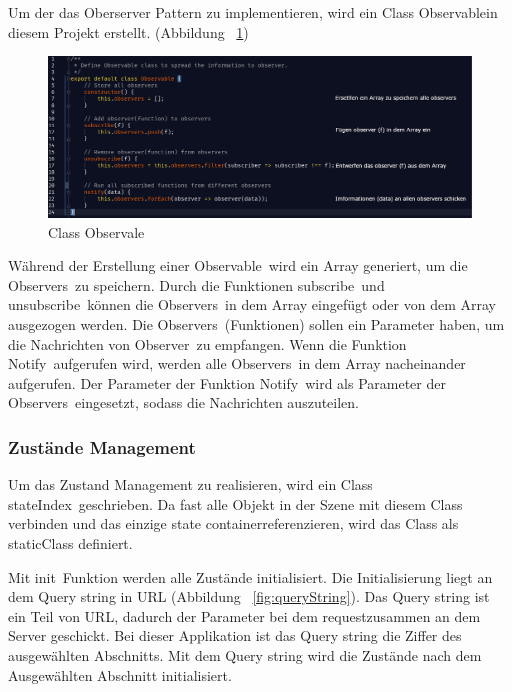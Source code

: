   Um der das Oberserver Pattern zu implementieren, wird ein Class \glqq Observable\grqq in diesem Projekt erstellt. (Abbildung ~\ref{fig:observable})
  
\begin{figure}[ht]
\vspace*{0.3cm}
\centering
\includegraphics[width=\textwidth]{images/observable.png}
\caption[Class Observable]{Class Observale}
\label{fig:observable} 
\end{figure}
  
  Während der Erstellung einer \glqq Observable\grqq\ wird ein Array generiert, um die \glqq Observers\grqq\ zu speichern. Durch die Funktionen \glqq subscribe\grqq\ und \glqq unsubscribe\grqq\ können die \glqq Observers\grqq\ in dem Array eingefügt oder von dem Array ausgezogen werden. Die \glqq Observers\grqq\ (Funktionen) sollen ein Parameter haben, um die Nachrichten von \glqq Observer\grqq\ zu empfangen. Wenn die Funktion \glqq Notify\grqq\ aufgerufen wird, werden alle \glqq Observers\grqq\ in dem Array nacheinander aufgerufen. Der Parameter der Funktion \glqq Notify\grqq\ wird als Parameter der \glqq Observers\grqq\ eingesetzt, sodass die Nachrichten auszuteilen.
  
  \subsubsection{Zustände Management}
  
  Um das Zustand Management zu realisieren, wird ein Class \glqq stateIndex\grqq\ geschrieben. Da fast alle Objekt in der Szene mit diesem Class verbinden und das einzige \glqq state container\grqq referenzieren, wird das Class als \glqq static\grqq Class definiert.
  
  Mit \glqq init\grqq\ Funktion werden alle Zustände initialisiert. Die Initialisierung liegt an dem Query string in URL (Abbildung ~\ref{fig:queryString}). Das Query string ist ein Teil von URL, dadurch der  Parameter bei dem \glqq request\grqq zusammen an dem Server geschickt. Bei dieser Applikation ist das Query string die Ziffer des ausgewählten Abschnitts. Mit dem Query string wird die Zustände nach dem Ausgewählten Abschnitt initialisiert.
  
